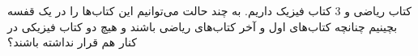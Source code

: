  کتاب ریاضی و 3 کتاب فیزیک داریم. به چند حالت می‌توانیم این کتاب‌ها را در یک قفسه بچینیم چنانچه
 کتاب‌های اول و آخر کتاب‌های ریاضی باشند و هیچ دو کتاب فیزیکی در کنار هم قرار نداشته باشند؟

